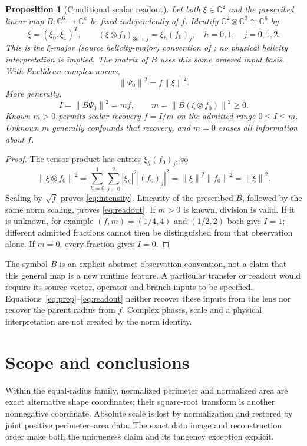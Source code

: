 \documentclass[11pt,a4paper]{article}
\newtheorem{proposition}[theorem]{Proposition}
\theoremstyle{definition}
\newcommand{\C}{\mathbb C}
\newcommand{\norm}[1]{\left\lVert#1\right\rVert}
\begin{document}
\begin{proposition}[Conditional scalar readout]\label{prop:observation}
Let both \(\xi\in\C^2\) and the prescribed linear map \(B:\C^6\to\C^k\) be fixed independently of \(f\). Identify \(\C^2\otimes\C^3\cong\C^6\) by
\[
 \xi=(\xi_0,\xi_1)^T,\qquad
 (\xi\otimes f_0)_{3h+j}=\xi_h(f_0)_j,
 \quad h=0,1,\quad j=0,1,2.
\]
This is the \(\xi\)-major (source helicity-major) convention of \citet[Section 6]{dmqpfref}; no physical helicity interpretation is implied. The matrix of \(B\) uses this same ordered input basis. With Euclidean complex norms,
\begin{equation}\label{eq:intensity}
 \norm{\Psi_0}^2=f\norm{\xi}^2.
\end{equation}
More generally,
\begin{equation}\label{eq:readout}
 I=\norm{B\Psi_0}^2=m f,\qquad
 m=\norm{B(\xi\otimes f_0)}^2\ge0.
\end{equation}
Known \(m>0\) permits scalar recovery \(f=I/m\) on the admitted range \(0\le I\le m\). Unknown \(m\) generally confounds that recovery, and \(m=0\) erases all information about \(f\).
\end{proposition}
\begin{proof}
The tensor product has entries \(\xi_h(f_0)_j\), so
\[
 \norm{\xi\otimes f_0}^2
 =\sum_{h=0}^1\sum_{j=0}^2|\xi_h|^2|(f_0)_j|^2
 =\norm{\xi}^2\norm{f_0}^2=\norm{\xi}^2.
\]
Scaling by \(\sqrt f\) proves \eqref{eq:intensity}. Linearity of the prescribed \(B\), followed by the same norm scaling, proves \eqref{eq:readout}. If \(m>0\) is known, division is valid. If it is unknown, for example \((f,m)=(1/4,4)\) and \((1/2,2)\) both give \(I=1\); different admitted fractions cannot then be distinguished from that observation alone. If \(m=0\), every fraction gives \(I=0\).
\end{proof}

The symbol \(B\) is an explicit abstract observation convention, not a claim that this general map is a new runtime feature. A particular transfer or readout would require its source vector, operator and branch inputs to be specified. Equations~\eqref{eq:prep}--\eqref{eq:readout} neither recover these inputs from the lens nor recover the parent radius from \(f\). Complex phases, scale and a physical interpretation are not created by the norm identity.

\section{Scope and conclusions}\label{sec:limits}
Within the equal-radius family, normalized perimeter and normalized area are exact alternative shape coordinates; their square-root transform is another nonnegative coordinate. Absolute scale is lost by normalization and restored by joint positive perimeter--area data. The exact data image and reconstruction order make both the uniqueness claim and its tangency exception explicit.
\end{document}
